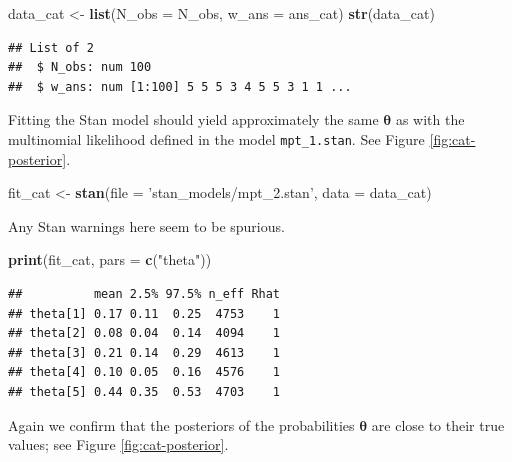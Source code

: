 \documentclass[12pt,]{krantz}
\newenvironment{Shaded}{\begin{snugshade}}{\end{snugshade}}
\newcommand{\KeywordTok}[1]{\textcolor[rgb]{0.13,0.29,0.53}{\textbf{#1}}}
\newcommand{\DataTypeTok}[1]{\textcolor[rgb]{0.13,0.29,0.53}{#1}}
\newcommand{\DecValTok}[1]{\textcolor[rgb]{0.00,0.00,0.81}{#1}}
\newcommand{\StringTok}[1]{\textcolor[rgb]{0.31,0.60,0.02}{#1}}
\newcommand{\OperatorTok}[1]{\textcolor[rgb]{0.81,0.36,0.00}{\textbf{#1}}}
\newcommand{\NormalTok}[1]{#1}
\theoremstyle{definition}
\theoremstyle{definition}
\theoremstyle{definition}
\theoremstyle{remark}
\begin{document}
\begin{Shaded}
\begin{Highlighting}[]
\NormalTok{data_cat <-}\StringTok{  }\KeywordTok{list}\NormalTok{(}\DataTypeTok{N_obs =}\NormalTok{ N_obs,}
                  \DataTypeTok{w_ans =}\NormalTok{ ans_cat)}
\KeywordTok{str}\NormalTok{(data_cat)}
\end{Highlighting}
\end{Shaded}

\begin{verbatim}
## List of 2
##  $ N_obs: num 100
##  $ w_ans: num [1:100] 5 5 5 3 4 5 5 3 1 1 ...
\end{verbatim}

Fitting the Stan model should yield approximately the same
\(\boldsymbol{\theta}\) as with the multinomial likelihood defined in
the model \texttt{mpt\_1.stan}. See Figure \ref{fig:cat-posterior}.

\begin{Shaded}
\begin{Highlighting}[]
\NormalTok{fit_cat <-}\StringTok{ }\KeywordTok{stan}\NormalTok{(}\DataTypeTok{file =} \StringTok{'stan_models/mpt_2.stan'}\NormalTok{, }
                \DataTypeTok{data =}\NormalTok{ data_cat) }
\end{Highlighting}
\end{Shaded}

Any Stan warnings here seem to be spurious.

\begin{Shaded}
\begin{Highlighting}[]
\KeywordTok{print}\NormalTok{(fit_cat, }\DataTypeTok{pars =} \KeywordTok{c}\NormalTok{(}\StringTok{"theta"}\NormalTok{))}
\end{Highlighting}
\end{Shaded}

\begin{verbatim}
##          mean 2.5% 97.5% n_eff Rhat
## theta[1] 0.17 0.11  0.25  4753    1
## theta[2] 0.08 0.04  0.14  4094    1
## theta[3] 0.21 0.14  0.29  4613    1
## theta[4] 0.10 0.05  0.16  4576    1
## theta[5] 0.44 0.35  0.53  4703    1
\end{verbatim}

Again we confirm that the posteriors of the probabilities
\(\boldsymbol{\theta}\) are close to their true values; see Figure
\ref{fig:cat-posterior}.

\begin{Shaded}
\end{Shaded}
\end{document}
